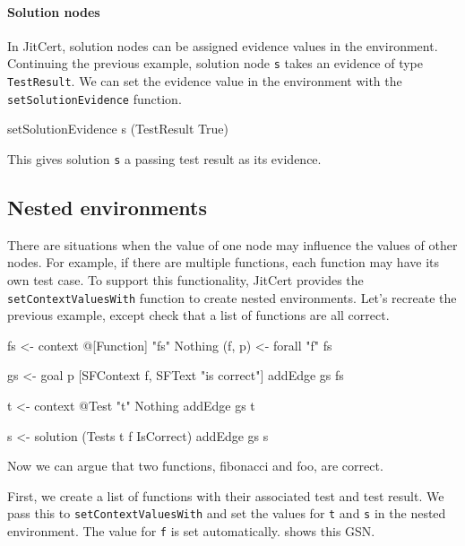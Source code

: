 \documentclass{article}
\newcommand{\jitcert}{JitCert\xspace}
\begin{document}
\paragraph{Solution nodes}
In \jitcert, solution nodes can be assigned evidence values in the environment. 
Continuing the previous example, solution node \texttt{s} takes an evidence of type \texttt{TestResult}. 
We can set the evidence value in the environment with the \texttt{setSolutionEvidence} function. 
\begin{mcode}
setSolutionEvidence s (TestResult True)
\end{mcode}
This gives solution \texttt{s} a passing test result as its evidence. 



\subsection{Nested environments}
\label{subsec:nestedenv}
There are situations when the value of one node may influence the values of other nodes. 
For example, if there are multiple functions, each function may have its own test case. 
To support this functionality, \jitcert provides the \texttt{setContextValuesWith} function to create nested environments. 
% 
% 
% 
Let's recreate the previous example, except check that a list of functions are all correct.
\begin{mcode}
fs <- context @[Function] "fs" Nothing
(f, p) <- forall "f" fs

gs <- goal p [SFContext f, SFText "is correct"]
addEdge gs fs

t <- context @Test "t" Nothing
addEdge gs t

s <- solution (Tests t f IsCorrect)
addEdge gs s
\end{mcode}
Now we can argue that two functions, fibonacci and foo, are correct.
First, we create a list of functions with their associated test and test result. 
We pass this to \texttt{setContextValuesWith} and set the values for \texttt{t} and \texttt{s} in the nested environment. 
The value for \texttt{f} is set automatically. 
 shows this GSN. 
\end{document}
